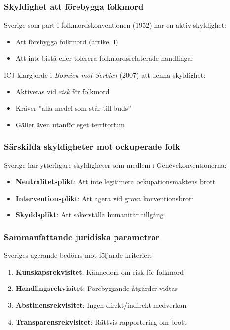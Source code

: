 \subsubsection{Skyldighet att förebygga folkmord}
Sverige som part i folkmordskonventionen (1952) har en aktiv skyldighet:
\begin{itemize}
\item Att förebygga folkmord (artikel I)
\item Att inte bistå eller tolerera folkmordsrelaterade handlingar
\end{itemize}
ICJ klargjorde i \textit{Bosnien mot Serbien} (2007) att denna skyldighet:
\begin{itemize}
\item Aktiveras vid \textit{risk} för folkmord
\item Kräver ”alla medel som står till buds”
\item Gäller även utanför eget territorium
\end{itemize}



\subsubsection{Särskilda skyldigheter mot ockuperade folk}
Sverige har ytterligare skyldigheter som medlem i Genèvekonventionerna:
\begin{itemize}
\item \textbf{Neutralitetsplikt}: Att inte legitimera ockupationsmaktens brott
\item \textbf{Interventionsplikt}: Att agera vid grova konventionsbrott
\item \textbf{Skyddsplikt}: Att säkerställa humanitär tillgång
\end{itemize}

\subsubsection{Sammanfattande juridiska parametrar}
Sveriges agerande bedöms mot följande kriterier:
\begin{enumerate}
\item \textbf{Kunskapsrekvisitet}: Kännedom om risk för folkmord
\item \textbf{Handlingsrekvisitet}: Förebyggande åtgärder vidtas
\item \textbf{Abstinensrekvisitet}: Ingen direkt/indirekt medverkan
\item \textbf{Transparensrekvisitet}: Rättvis rapportering om brott
\end{enumerate}
